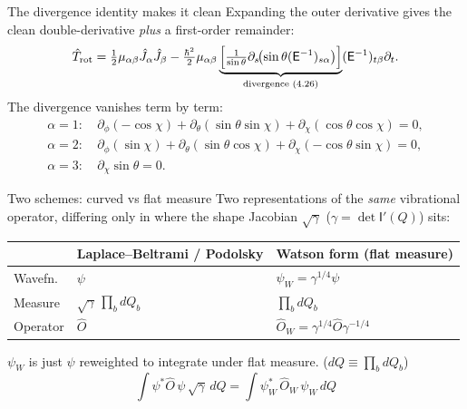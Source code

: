 \documentclass[aspectratio=169,10pt]{beamer}
\newcommand{\stagenum}{0}
\newcommand{\setstage}[1]{\renewcommand{\stagenum}{#1}}
\begin{document}
\begin{frame}{The divergence identity makes it clean}
\setstage{3}
Expanding the outer derivative gives the clean double-derivative \emph{plus} a first-order remainder:
\begin{equation*}
\hat T_{\mathrm{rot}}=\tfrac12\mu_{\alpha\beta}\hat J_\alpha\hat J_\beta
-\tfrac{\hbar^2}{2}\mu_{\alpha\beta}\underbrace{\Bigl[\tfrac{1}{\sin\theta}\partial_s\!\bigl(\sin\theta(\mathsf E^{-1})_{s\alpha}\bigr)\Bigr]}_{\text{divergence (4.26)}}(\mathsf E^{-1})_{t\beta}\partial_t .
\end{equation*}
The divergence vanishes term by term:
\begin{align*}
\alpha{=}1:&\ \partial_\phi(-\cos\chi)+\partial_\theta(\sin\theta\sin\chi)+\partial_\chi(\cos\theta\cos\chi)=0,\\
\alpha{=}2:&\ \partial_\phi(\sin\chi)+\partial_\theta(\sin\theta\cos\chi)+\partial_\chi(-\cos\theta\sin\chi)=0,\\
\alpha{=}3:&\ \partial_\chi\sin\theta=0.
\end{align*}
\end{frame}

\begin{frame}{Two schemes: curved vs flat measure}
\setstage{3}
\small
Two representations of the \emph{same} vibrational operator, differing only in where the shape Jacobian $\sqrt\gamma$ ($\gamma=\det\mathsf I'(Q)$) sits:
\begin{center}
\begin{tabular}{@{}l|p{}|p{}@{}}
 & \textbf{Laplace--Beltrami / Podolsky} & \textbf{Watson form (flat measure)}\\[1pt]
\hline
Wavefn. & $\psi$ & $\psi_W=\gamma^{1/4}\psi$\\[3pt]
Measure & $\sqrt\gamma\,\prod_b dQ_b$ & $\prod_b dQ_b$ \\[3pt]
Operator & $\hat{O}$ & $\hat O_W = \gamma^{1/4}\hat O\gamma^{-1/4}$\\
\end{tabular}
\end{center}
$\psi_W$ is just $\psi$ reweighted to integrate under flat measure. ($dQ\equiv\prod_b dQ_b$)
\begin{equation*}
\boxed{\;\int\psi^{*}\hat O\,\psi\,\sqrt\gamma\,dQ=\int\psi_W^{*}\,\hat O_W\,\psi_W\,dQ\;}
\end{equation*}
\end{frame}
\end{document}
